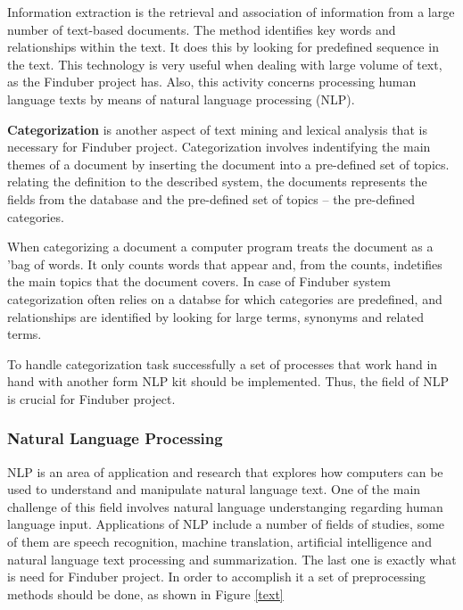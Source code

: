 Information extraction is the retrieval and association of information from a large number of text-based documents. The method identifies key words and relationships within the text. It does this by looking for predefined sequence in the text. This technology is very useful when dealing with large volume of text, as the Finduber project has. Also, this activity concerns processing human language texts by means of natural language processing (NLP). 

\textbf{Categorization} is another aspect of text mining and lexical analysis that is necessary for Finduber project. Categorization involves indentifying the main themes of a document by inserting the document into a pre-defined set of topics. relating the definition to the described system, the documents represents the fields from the database and the pre-defined set of topics -- the pre-defined categories. 

When categorizing a document a computer program treats the document as a 'bag of words. It only counts words that appear and, from the counts, indetifies the main topics that the document covers. In case of Finduber system categorization often relies on a databse for which categories are predefined, and relationships are identified by looking for large terms, synonyms and related terms.

To handle categorization task successfully a set of processes that work hand in hand with another form NLP kit should be implemented. Thus, the field of NLP is crucial for Finduber project.

\subsubsection{Natural Language Processing}

NLP is an area of application and research that explores how computers can be used to understand and manipulate natural language text. One of the main challenge of this field involves natural language understanging regarding human language input. Applications of NLP include a number of fields of studies, some of them are speech recognition, machine translation, artificial intelligence and natural language text processing and summarization. The last one is exactly what is need for Finduber project. In order to accomplish it a set of preprocessing methods should be done, as shown in Figure \ref{text}

